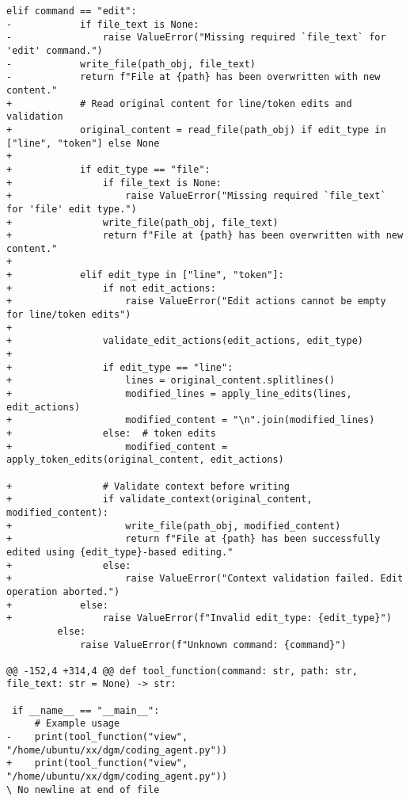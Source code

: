 \begin{lstlisting}[style=diffstyle]
         elif command == "edit":
-            if file_text is None:
-                raise ValueError("Missing required `file_text` for 'edit' command.")
-            write_file(path_obj, file_text)
-            return f"File at {path} has been overwritten with new content."
+            # Read original content for line/token edits and validation
+            original_content = read_file(path_obj) if edit_type in ["line", "token"] else None
+
+            if edit_type == "file":
+                if file_text is None:
+                    raise ValueError("Missing required `file_text` for 'file' edit type.")
+                write_file(path_obj, file_text)
+                return f"File at {path} has been overwritten with new content."
+
+            elif edit_type in ["line", "token"]:
+                if not edit_actions:
+                    raise ValueError("Edit actions cannot be empty for line/token edits")
+
+                validate_edit_actions(edit_actions, edit_type)
+
+                if edit_type == "line":
+                    lines = original_content.splitlines()
+                    modified_lines = apply_line_edits(lines, edit_actions)
+                    modified_content = "\n".join(modified_lines)
+                else:  # token edits
+                    modified_content = apply_token_edits(original_content, edit_actions)
 
+                # Validate context before writing
+                if validate_context(original_content, modified_content):
+                    write_file(path_obj, modified_content)
+                    return f"File at {path} has been successfully edited using {edit_type}-based editing."
+                else:
+                    raise ValueError("Context validation failed. Edit operation aborted.")
+            else:
+                raise ValueError(f"Invalid edit_type: {edit_type}")
         else:
             raise ValueError(f"Unknown command: {command}")
 
@@ -152,4 +314,4 @@ def tool_function(command: str, path: str, file_text: str = None) -> str:
 
 if __name__ == "__main__":
     # Example usage
-    print(tool_function("view", "/home/ubuntu/xx/dgm/coding_agent.py"))
+    print(tool_function("view", "/home/ubuntu/xx/dgm/coding_agent.py"))
\ No newline at end of file
\end{lstlisting}